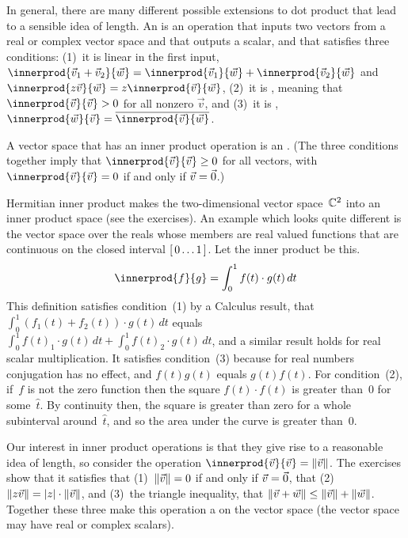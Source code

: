 In general, there are many different possible extensions to dot product
that lead to a sensible idea of length.
An  is an operation
that inputs two vectors from a real or complex vector space 
and that outputs a scalar, and that satisfies 
three conditions:
(1)~it is linear in the first input,
$\innerprod{\vec{v}_1+\vec{v}_2}{\vec{w}}
 = \innerprod{\vec{v}_1}{\vec{w}}
   +\innerprod{\vec{v}_2}{\vec{w}}$
and $\innerprod{z\vec{v}}{\vec{w}}
     =z\innerprod{\vec{v}}{\vec{w}}$,
(2)~it is , meaning that
$\innerprod{\vec{v}}{\vec{v}}> 0$ for all nonzero $\vec{v}$,
and (3)~it is , 
$\innerprod{\vec{w}}{\vec{v}}=\compconj{\innerprod{\vec{v}}{\vec{w}}}$.

A vector space that has an inner product operation is an
.
(The three conditions together imply
that $\innerprod{\vec{v}}{\vec{v}}\geq 0$ for all vectors,
with $\innerprod{\vec{v}}{\vec{v}}=0$ if and only if $\vec{v}=\vec{0}$.)

Hermitian inner product makes the two-dimensional vector space~$\mathbb{C}^2$ into 
an inner product space (see the exercises).
An example which looks quite different 
is the vector space over the reals whose members are
real valued functions that are continuous on the 
closed interval $[\,0\ldots 1\,]$.
Let the inner product be this.
\begin{equation*}
  \innerprod{f}{g}=\int_{0}^1 f(t)\cdot g(t)\,dt
\end{equation*}
This definition satisfies
condition~(1) by a Calculus result, that  
$\int_{0}^1 (f_1(t)+f_2(t))\cdot g(t)\,dt$ equals 
$\int_{0}^1 f(t)_1\cdot g(t)\,dt+\int_{0}^1 f(t)_2\cdot g(t)\,dt$,
and a similar result holds for real scalar multiplication. 
It satisfies condition~(3) because for real numbers conjugation has no effect,
and $f(t)g(t)$ equals $g(t)f(t)$. 
For condition~(2), if~$f$ is not the zero function then 
the square $f(t)\cdot f(t)$ is greater than~$0$ for some~$\hat{t}$.
By continuity then, the square is greater than zero for a whole subinterval
around~$\hat{t}$,
and so the area under the curve is greater than~$0$.

Our interest in inner product operations
is that they give rise to a reasonable idea of length, 
so consider the operation
$\innerprod{\vec{v}}{\vec{v}}=\norm{\vec{v}}$.
The exercises show that it satisfies that 
(1)~$\lVert\vec{v}\rVert=0$ if and only if
$\vec{v}=\vec{0}$,
that (2)~$\lVert z\vec{v}\rVert=\lvert z\rvert\cdot\lVert\vec{v}\rVert$, and
(3)~the triangle inequality, that 
$\lVert\vec{v}+\vec{w}\rVert\leq\lVert\vec{v}\rVert+\lVert\vec{w}\rVert$.
Together these three make this operation a  on the
vector space (the vector space may have real or complex scalars).

